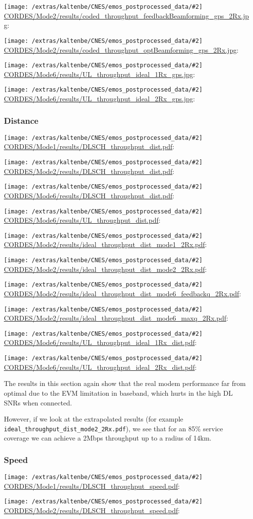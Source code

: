 \documentclass[a4paper,10pt]{article}
\newcommand{\printfile}[2][]{
 \begin{minipage}{8cm}
  \centering
  \texttt{[image: /extras/kaltenbe/CNES/emos\_postprocessed\_data/\#2]}
  \url{#2}: #1

 \end{minipage}
}
\begin{document}
\printfile{CORDES/Mode2/results/coded_throughput_feedbackBeamforming_gps_2Rx.jpg}
\printfile{CORDES/Mode2/results/coded_throughput_optBeamforming_gps_2Rx.jpg}

\printfile{CORDES/Mode6/results/UL_throughput_ideal_1Rx_gps.jpg}
\printfile{CORDES/Mode6/results/UL_throughput_ideal_2Rx_gps.jpg}

\subsubsection{Distance}

\printfile{CORDES/Mode1/results/DLSCH_throughput_dist.pdf}
\printfile{CORDES/Mode2/results/DLSCH_throughput_dist.pdf}

\printfile{CORDES/Mode6/results/DLSCH_throughput_dist.pdf}
\printfile{CORDES/Mode6/results/UL_throughput_dist.pdf}


\printfile{CORDES/Mode2/results/ideal_throughput_dist_mode1_2Rx.pdf}
%
\printfile{CORDES/Mode2/results/ideal_throughput_dist_mode2_2Rx.pdf}

\printfile{CORDES/Mode2/results/ideal_throughput_dist_mode6_feedbackq_2Rx.pdf}
%
\printfile{CORDES/Mode2/results/ideal_throughput_dist_mode6_maxq_2Rx.pdf}

\printfile{CORDES/Mode6/results/UL_throughput_ideal_1Rx_dist.pdf}
\printfile{CORDES/Mode6/results/UL_throughput_ideal_2Rx_dist.pdf}

The results in this section again show that the real modem performance far from optimal due to the EVM limitation in baseband, which hurts in the high DL SNRs when connected.

However, if we look at the extrapolated results (for example \verb+ideal_throughput_dist_mode2_2Rx.pdf+), we see that for an 85\% service coverage we can achieve a 2Mbps throughput up to a radius of 14km. 

\subsubsection{Speed}

\printfile{CORDES/Mode1/results/DLSCH_throughput_speed.pdf}
\printfile{CORDES/Mode2/results/DLSCH_throughput_speed.pdf}
\end{document}
